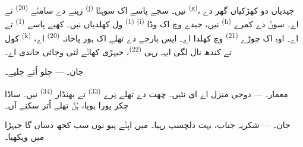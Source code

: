 زینے دے سامݨے  \textsuperscript{(20)} تے 
\textsuperscript{(j)} نیں۔ سجے پاسے اک سوہݨا 
\textsuperscript{(g)}، جیدیاں دو کھڑکیاں گھر دے  \textsuperscript{(1)}
ول کھلدیاں نیں۔ کھبے پاسے  \textsuperscript{(1)} تے
 \textsuperscript{(i)} نیں، جیدے وچ اک وڈا 
\textsuperscript{(h)} اے۔ سوݨ دے کمرے کول 
\textsuperscript{(k)} اے۔ اوہ اک چوڑے  \textsuperscript{(21)} وچ
کھلدا اے۔ ایس بارجے دے تھلے اک ہور پاخانہ \textsuperscript{(20)} اے، تے کندھ نال
لگی ایہہ رہی  \textsuperscript{(22)}، جیہڑی کھاݨے لئی وجائی جاندی اے۔

\textsc{جان}۔ --- چلو  اُتے چلیے۔

\textsc{معمار}۔ --- دوجی منزل اے ای نئیں۔ چھت دے تھلے نِرے 
\textsuperscript{(33)} تے بھنڈار \textsuperscript{(34)} نیں۔ ساڈا چکر پورا ہویا، ہُݨ
تھلے اُتر سکنے آں۔

\textsc{جان}۔ --- شکریہ جناب، بہت دلچسپ رہیا۔ میں اپݨے پیو نوں سب کجھ دساں گا
جیہڑا میں ویکھیا۔
\VUsaut{4.0mm}
\VUfilet{22mm}

